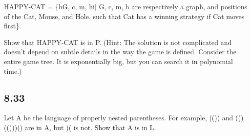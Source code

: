 HAPPY-CAT = \{hG, c, m, hi| G, c, m, h are respectively a graph, and positions of the Cat, Mouse, and Hole, such that Cat has a winning strategy if Cat moves first\}.

Show that HAPPY-CAT is in P. (Hint: The solution is not complicated and doesn't depend on subtle details in the way the game is defined. Consider the entire game tree. It is exponentially big, but you can search it in polynomial time.)


\subsection*{8.33}

Let A be the language of properly nested parentheses. For example, (()) and (()(()))() are in A, but )( is not. Show that A is in L.


\clearpage
